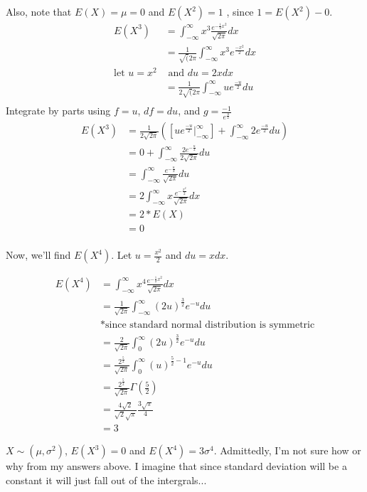 \documentclass{tufte-book}
\theoremstyle{mytheoremstyle}
\theoremstyle{mylemstyle}
\theoremstyle{mydefstyle}
\begin{document}
Also, note that $E(X)=\mu=0$ and $E(X^2) = 1$ , since $1 = E(X^2) - 0$.
\begin{align*}
E(X^3)&= \int_{-\infty}^{\infty} x^3\frac{e^{-\frac{1}{2}x^2}}{\sqrt{2\pi}}dx\\
&=\frac{1}{\sqrt(2\pi}\int_{-\infty}^{\infty}x^3e^{\frac{-x^2}{2}}dx\\
\text{let $u=x^2$}& \text{ and $du=2xdx$}\\
&=\frac{1}{2\sqrt(2\pi}\int_{-\infty}^{\infty}ue^{\frac{-u}{2}}du\\
\end{align*}
Integrate by parts using $f=u$, $df=du$, and $g=\frac{-1}{e^{\frac{u}{2}}}$
\begin{align*}
E(X^3)&=\frac{1}{2\sqrt{2\pi}}([ue^{\frac{-u}{2}}\Big|_{-\infty}^{\infty}]+\int_{-\infty}^{\infty}2e^{\frac{-u}{2}}du)\\
&=0 + \int_{-\infty}^{\infty}\frac{2e^{-\frac{u}{2}}}{2\sqrt{2\pi}}du\\
&= \int_{-\infty}^{\infty}\frac{e^{-\frac{u}{2}}}{\sqrt{2\pi}}du\\
&= 2\int_{-\infty}^{\infty}x\frac{e^{-\frac{x^2}{2}}}{\sqrt{2\pi}}dx\\
&= 2*E(X)\\
&= 0\\
\end{align*}

Now, we'll find $E(X^4)$.  Let $u=\frac{x^2}{2}$ and $du=xdx$.

\begin{align*}
E(X^4)&=\int_{-\infty}^{\infty} x^4\frac{e^{-\frac{1}{2}x^2}}{\sqrt{2\pi}}dx\\
&=\frac{1}{\sqrt{2\pi}} \int_{-\infty}^{\infty}(2u)^{\frac{3}{2}}e^{-u}du\\
&\text{*since standard normal distribution is symmetric}\\
&=\frac{2}{\sqrt{2\pi}} \int_{0}^{\infty}(2u)^{\frac{3}{2}}e^{-u}du\\
&=\frac{2^{\frac{5}{2}}}{\sqrt{2\pi}}\int_{0}^{\infty}(u)^{\frac{5}{2}-1}e^{-u}du\\
&=\frac{2^{\frac{5}{2}}}{\sqrt{2\pi}}\Gamma(\frac{5}{2})\\
&= \frac{4\sqrt{2}}{\sqrt{2}\sqrt{\pi}} \frac{3\sqrt{\pi}}{4}\\
&= 3
\end{align*}

 $X\sim(\mu,\sigma^2)$, $E(X^3)=0$ and $E(X^4)=3\sigma^4$.  Admittedly, I'm not sure how or why from my answers above.  I imagine that since standard deviation will be a constant it will just fall out of the intergrals...
\end{document}

